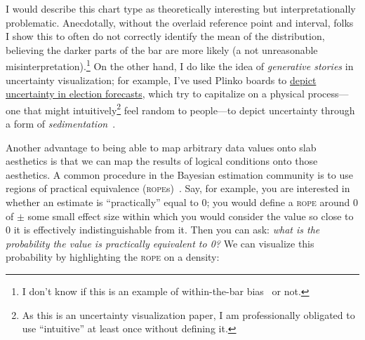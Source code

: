 \documentclass[journal]{vgtc}                     %
\begin{document}
I would describe this chart type as theoretically interesting but interpretationally problematic. Anecdotally, without the overlaid reference point and interval, folks I show this to often do not correctly identify the mean of the distribution, believing the darker parts of the bar are more likely (a not unreasonable misinterpretation).\footnote{I don't know if this is an example of within-the-bar bias~\cite{newman2012bar} or not.} On the other hand, I do like the idea of \textit{generative stories} in uncertainty visualization; for example, I've used Plinko boards to \href{https://presidential-plinko.com/}{depict uncertainty in election forecasts}, which try to capitalize on a physical process---one that might intuitively\footnote{As this is an uncertainty visualization paper, I am professionally obligated to use ``intuitive'' at least once without defining it.} feel random to people---to depict uncertainty through a form of \textit{sedimentation}~\cite{huron2013sediment}.

Another advantage to being able to map arbitrary data values onto slab aesthetics is that we can map the results of logical conditions onto those aesthetics. A common procedure in the Bayesian estimation community is to use regions of practical equivalence (\textsc{rope}s)~\cite{kruschke2018rejecting}. Say, for example, you are interested in whether an estimate is ``practically'' equal to 0; you would define a \textsc{rope} around 0 of $\pm$ some small effect size within which you would consider the value so close to 0 it is effectively indistinguishable from it. Then you can ask: \textit{what is the probability the value is practically equivalent to 0?} We can visualize this probability by highlighting the \textsc{rope} on a density:
\end{document}
